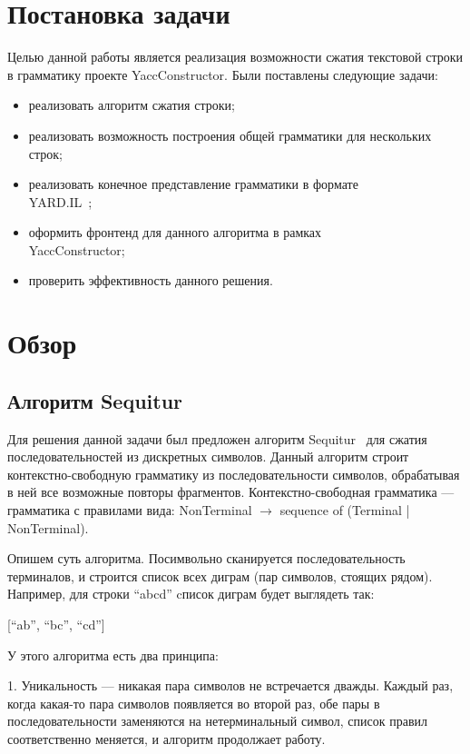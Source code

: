 \documentclass[14pt]{matmex-diploma}
\begin{document}
\section{Постановка задачи}
    Целью данной работы является реализация возможности сжатия текстовой строки в грамматику проекте YaccConstructor. 
    Были поставлены следующие задачи:
    \begin{itemize}
        \item реализовать алгоритм сжатия строки;
        \item реализовать возможность построения общей грамматики для нескольких строк;  
        \item реализовать конечное представление грамматики в формате \\YARD.IL~\cite{YARD};
        \item оформить фронтенд для данного алгоритма в рамках \\YaccConstructor;
        \item проверить эффективность данного решения.
    \end{itemize}
    
\section{Обзор}
	\subsection{Алгоритм Sequitur}
	Для решения данной задачи был предложен алгоритм Sequitur~\cite{sequitur} для сжатия последовательностей из дискретных символов. Данный алгоритм строит контекстно-свободную грамматику из последовательности символов, обрабатывая в ней все возможные повторы фрагментов. Контекстно-свободная грамматика --- грамматика с правилами вида: NonTerminal $\rightarrow$ sequence of (Terminal | NonTerminal). 
	
	Опишем суть алгоритма.
	Посимвольно сканируется последовательность терминалов, и строится список всех диграм (пар символов, стоящих рядом).
	Например, для строки “abcd” cписок диграм будет выглядеть так:
	
	[“ab”, “bc”, “cd”]

    У этого алгоритма есть два принципа:

    1. Уникальность --- никакая пара символов не встречается дважды. Каждый раз, когда какая-то пара символов появляется во второй раз, обе пары в последовательности заменяются на нетерминальный символ, список правил соответственно меняется, и алгоритм продолжает работу. 
\end{document}
